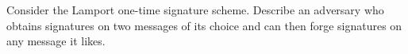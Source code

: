 \documentclass[12pt,letterpaper,boxed]{amspset}
\begin{document}
\begin{problem}[12.3]
Consider the Lamport one-time signature scheme. Describe an adversary who obtains signatures on two messages of its choice and can then forge signatures on any message it likes.
\end{problem}

\begin{solution}
\vspace{4cm}
\end{solution}



\end{document}
